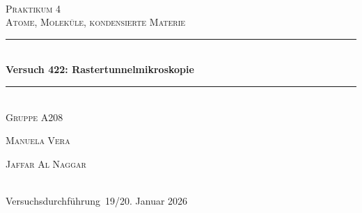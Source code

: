 

\setlength\headheight{24pt}
\setlength\footheight{15pt}
\chead{}						%
\ohead{\textbf{\headmark}}		%
\cfoot*{\pagemark}				%
\renewcommand*\chapterheadstartvskip{\vspace*{-1cm}}




\begin{titlepage}
\newcommand{\HRule}{\rule{\linewidth}{0.5mm}}
\center
\textsc{\LARGE }\\[1.5cm] %
\textsc{\LARGE Praktikum 4}\\[0.5cm] %
\textsc{\large Atome, Moleküle, kondensierte Materie}\\[0.5cm] %

\HRule \\[0.4cm]
{ \huge \bfseries Versuch 422: Rastertunnelmikroskopie }\\[0.4cm] %
\HRule \\[0.2cm]
\Large{\textsc{Gruppe A208}}\\[0.2cm]
 
\begin{minipage}{0.4\textwidth}
\begin{flushleft} \large
\textsc{Manuela Vera} %
\end{flushleft}
\end{minipage}
\begin{minipage}{0.4\textwidth}
\begin{flushright} \large
\textsc{Jaffar Al Naggar}
\end{flushright}
\end{minipage}\\[2.0cm]

{\large Versuchsdurchführung\, 19/20. Januar 2026 }\\[8cm] %


\end{titlepage}
